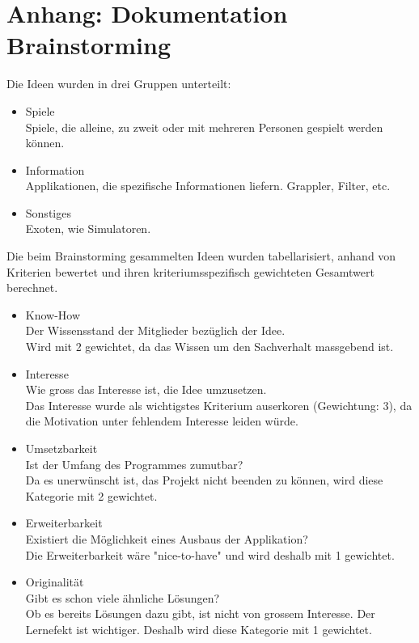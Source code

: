 \documentclass[10pt,a4paper,titlepage,twoside,german,final]{zhawreprt}
\begin{document}
\newpage
\section{Anhang: Dokumentation Brainstorming}\label{chp:AppendixBrainstorming}
Die Ideen wurden in drei Gruppen unterteilt:
\begin{itemize}
\item Spiele\\
Spiele, die alleine, zu zweit oder mit mehreren Personen gespielt werden können.
\item Information\\
Applikationen, die spezifische Informationen liefern. Grappler, Filter, etc.
\item Sonstiges\\
Exoten, wie Simulatoren.
\end{itemize}
Die beim Brainstorming gesammelten Ideen wurden tabellarisiert, anhand von Kriterien bewertet und ihren kriteriumsspezifisch gewichteten Gesamtwert berechnet.
\begin{itemize}
\item Know-How\\
Der Wissensstand der Mitglieder bezüglich der Idee.\\
Wird mit 2 gewichtet, da das Wissen um den Sachverhalt massgebend ist.
\item Interesse\\
Wie gross das Interesse ist, die Idee umzusetzen.\\
Das Interesse wurde als wichtigstes Kriterium auserkoren (Gewichtung: 3), da die Motivation unter fehlendem Interesse leiden würde.
\item Umsetzbarkeit\\
Ist der Umfang des Programmes zumutbar?\\
Da es unerwünscht ist, das Projekt nicht beenden zu können, wird diese Kategorie mit 2 gewichtet.
\item Erweiterbarkeit\\
Existiert die Möglichkeit eines Ausbaus der Applikation?\\
Die Erweiterbarkeit wäre "nice-to-have" und wird deshalb mit 1 gewichtet.
\item Originalität\\
Gibt es schon viele ähnliche Lösungen?\\
Ob es bereits Lösungen dazu gibt, ist nicht von grossem Interesse. Der Lernefekt ist wichtiger. Deshalb wird diese Kategorie mit 1 gewichtet.
\end{itemize}
\end{document}
